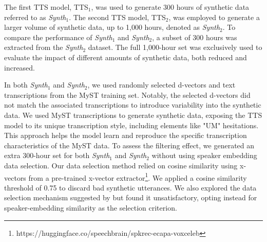 
The first TTS model, TTS$_1$, was used to generate 300 hours of synthetic data referred to as \textit{Synth$_1$}. The second TTS model, TTS$_2$, was employed to generate a larger volume of synthetic data, up to 1,000 hours, denoted as \textit{Synth$_2$}. To compare the performance of \textit{Synth$_1$} and \textit{Synth$_2$}, a subset of 300 hours was extracted from the \textit{Synth$_2$} dataset. The full 1,000-hour set was exclusively used to evaluate the impact of different amounts of synthetic data, both reduced and increased.

In both \textit{Synth$_1$} and \textit{Synth$_2$}, we used randomly selected d-vectors and text transcriptions from the MyST training set. Notably, the selected d-vectors did not match the associated transcriptions to introduce variability into the synthetic data.
We used MyST transcriptions to generate synthetic data, exposing the TTS model to its unique transcription style, including elements like "UM" hesitations. This approach helps the model learn and reproduce the specific transcription characteristics of the MyST data.
To assess the filtering effect, we generated an extra 300-hour set for both \textit{Synth$_1$} and \textit{Synth$_2$} without using speaker embedding data selection. Our data selection method relied on cosine similarity using x-vectors from a pre-trained x-vector extractor\footnote{https://huggingface.co/speechbrain/spkrec-ecapa-voxceleb}. We applied a cosine similarity threshold of 0.75 to discard bad synthetic utterances. We also explored the data selection mechanism suggested by \cite{hu2022synt++} but found it unsatisfactory, opting instead for speaker-embedding similarity as the selection criterion.

